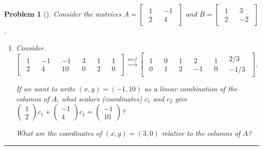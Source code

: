 \documentclass[letterpaper,oneside]{book}%
\theoremstyle{plain}
\theoremstyle{box}
\theoremstyle{problem}
\newtheorem{problemnum}{Problem}[chapter]
\newenvironment{problem}[1][]{\begin{problemnum}[#1]}{\end{problemnum}\nopagebreak\hrule\bigskip}
\newcommand{\pvec}[1]{\begin{pmatrix} #1 \end{pmatrix}}
\newcommand{\nvec}[1]{\begin{matrix} #1 \end{matrix}}
\newcommand{\bvec}[1]{\begin{bmatrix} #1 \end{bmatrix}}
\begin{document}
\begin{problem}
 Consider the matrices $A=\bvec{\nvec{1\\2}&\nvec{-1\\4}}$ and $B=\bvec{\nvec{1\\2}&\nvec{3\\-2}}$.  
 \begin{enumerate}
  \item 
  Consider  
  $\bvec{\nvec{1\\2}&\nvec{-1\\4}&\nvec{-1\\10}&\nvec{3\\0}&\nvec{1\\2}&\nvec{1\\0}}
  \xrightarrow{rref}
  \bvec{\nvec{1\\0}&\nvec{0\\1}&\nvec{1\\2}&\nvec{2\\-1}&\nvec{1\\0}&\nvec{2/3\\-1/3}}
  $.
  
  If we want to write $(x,y)=(-1,10)$ as a linear combination of the columns of $A$, what scalars (coordinates) $c_1$ and $c_2$ give $\pvec{1\\2}c_1+\pvec{-1\\4}c_1=\pvec{-1\\10}$?
  
  What are the coordinates of $(x,y)=(3,0)$ relative to the columns of $A$?  


\end{enumerate}
\end{problem}
\end{document}
